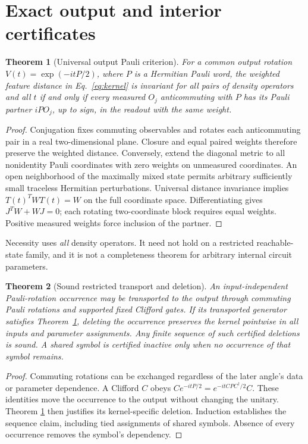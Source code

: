 \documentclass[a4paper,twocolumn,11pt,unpublished]{quantumarticle}
\newtheorem{theorem}{Theorem}
\begin{document}
\section{Exact output and interior certificates}
\begin{theorem}[Universal output Pauli criterion]
\label{thm:output}
For a common output rotation $V(t)=\exp(-itP/2)$, where $P$ is a
Hermitian Pauli word, the weighted feature distance in
Eq.~\eqref{eq:kernel} is invariant for all pairs of density operators
and all $t$ if and only if every measured $O_j$ anticommuting with $P$
has its Pauli partner $iPO_j$, up to sign, in the readout with the
same weight.
\end{theorem}
\begin{proof}
Conjugation fixes commuting observables and rotates each anticommuting
pair in a real two-dimensional plane. Closure and equal paired weights
therefore preserve the weighted distance. Conversely, extend the
diagonal metric to all nonidentity Pauli coordinates with zero weights
on unmeasured coordinates. An open neighborhood of the maximally mixed
state permits arbitrary sufficiently small traceless Hermitian
perturbations. Universal distance invariance implies $T(t)^TWT(t)=W$
on the full coordinate space. Differentiating gives $J^TW+WJ=0$;
each rotating two-coordinate block requires equal weights. Positive
measured weights force inclusion of the partner.
\end{proof}
Necessity uses \emph{all} density operators. It need not hold on a
restricted reachable-state family, and it is not a completeness theorem
for arbitrary internal circuit parameters.



\begin{theorem}[Sound restricted transport and deletion]
\label{thm:transport}
An input-independent Pauli-rotation occurrence may be transported to
the output through commuting Pauli rotations and supported fixed
Clifford gates. If its transported generator satisfies
Theorem~\ref{thm:output}, deleting the occurrence preserves the kernel
pointwise in all inputs and parameter assignments. Any finite sequence
of such certified deletions is sound. A shared symbol is certified
inactive only when no occurrence of that symbol remains.
\end{theorem}
\begin{proof}
Commuting rotations can be exchanged regardless of the later angle's
data or parameter dependence. A Clifford $C$ obeys
$C e^{-itP/2}=e^{-itCPC^\dagger/2}C$. These identities move the
occurrence to the output without changing the unitary. Theorem
\ref{thm:output} then justifies its kernel-specific deletion.
Induction establishes the sequence claim, including tied assignments
of shared symbols. Absence of every occurrence removes the symbol's
dependency.
\end{proof}
\end{document}
